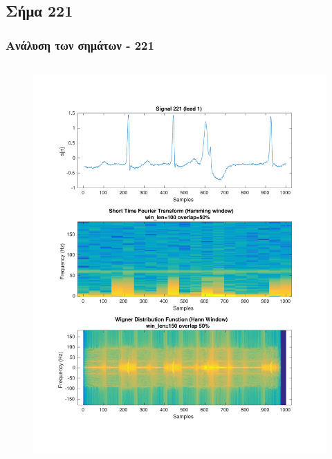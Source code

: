 \documentclass{beamer}
\begin{document}
\subsection{Σήμα 221}
\label{sig:221}
\begin{frame}
\frametitle{Ανάλυση των σημάτων - 221}

\begin{columns}
\begin{figure}
\includegraphics[width=\textwidth]{fig/221l1_stft_wdf.pdf}
\end{figure}


\end{columns}
\end{frame}
\end{document}
